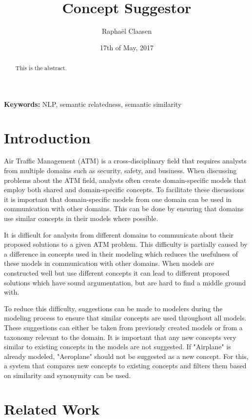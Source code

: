 \documentclass{article}
\title{Concept Suggestor}
\date{17th of May, 2017}
\author{Rapha\"el Claasen}
\begin{document}
\maketitle

\begin{abstract}
This is the abstract.
\end{abstract}

{\bf Keywords:} NLP, semantic relatedness, semantic similarity

\section{Introduction}

Air Traffic Management (ATM) is a cross-disciplinary field that requires analysts from multiple domains such as security, safety, and business. When discussing problems about the ATM field, analysts often create domain-specific models that employ both shared and domain-specific concepts. To facilitate these discussions it is important that domain-specific models from one domain can be used in communication with other domains. This can be done by ensuring that domains use similar concepts in their models where possible.

It is difficult for analysts from different domains to communicate about their proposed solutions to a given ATM problem. This difficulty is partially caused by a difference in concepts used in their modeling which reduces the usefulness of these models in communication with other domains. When models are constructed well but use different concepts it can lead to different proposed solutions which have sound argumentation, but are hard to find a middle ground with.

To reduce this difficulty, suggestions can be made to modelers during the modeling process to ensure that similar concepts are used throughout all models. These suggestions can either be taken from previously created models or from a taxonomy relevant to the domain. 
It is important that any new concepts very similar to existing concepts in the models are not suggested. If "Airplane" is already modeled, "Aeroplane" should not be suggested as a new concept. For this, a system that compares new concepts to existing concepts and filters them based on similarity and synonymity can be used.

\section{Related Work}
\end{document}
